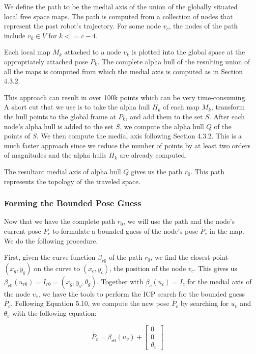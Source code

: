 We define the path to be the medial axis of the union of the globally situated local free space maps.  The path is computed from a collection of nodes that represent the past robot's trajectory.  For some node $v_c$, the nodes of the path include $v_k \in V$ for $k <= c-4$.

Each local map $M_k$ attached to a node $v_k$ is plotted into the global space at the appropriately attached pose $P_k$.  The complete alpha hull of the resulting union of all the maps is computed from which the medial axis is computed as in Section 4.3.2.

This approach can result in over 100k points which can be very time-consuming.  A short cut that we use is to take the alpha hull $H_k$ of each map $M_k$, transform the hull points to the global frame at $P_k$, and add them to the set $S$.  After each node's alpha hull is added to the set $S$, we compute the alpha hull $Q$ of the points of $S$.  We then compute the medial axis following Section 4.3.2.  This is a much faster approach since we reduce the number of points by at least two orders of magnitudes and the alpha hulls $H_k$ are already computed.

The resultant medial axis of alpha hull $Q$ gives us the path $r_0$.  This path represents the topology of the traveled space.

\subsubsection{Forming the Bounded Pose Guess}

Now that we have the complete path $r_0$, we will use the path and the node's current pose $P_c$ to formulate a bounded guess of the node's pose $\acute{P_c}$ in the map.  We do the following procedure.

First, given the curve function $\beta_{r0}$ of the path $r_0$, we find the closest point $(x_g,y_g)$ on the curve to $(x_c, y_c)$, the position of the node $v_c$.  This gives us $\beta_{r0}(u_{r0}) = I_{r0} = (x_g,y_g,\theta_g)$.   Together with $\beta_c(u_c) = I_c$ for the medial axis of the node $v_c$, we have the tools to perform the ICP search for the bounded guess $\acute{P_c}$.  Following Equation 5.10, we compute the new pose $\acute{P_c}$ by searching for $u_v$ and $\theta_v$ with the following equation:

\begin{equation}
\acute{P_c} = \beta_{r0}(u_v) +
\begin{bmatrix}
0 \\
0 \\
\theta_v
\end{bmatrix}
\end{equation}


